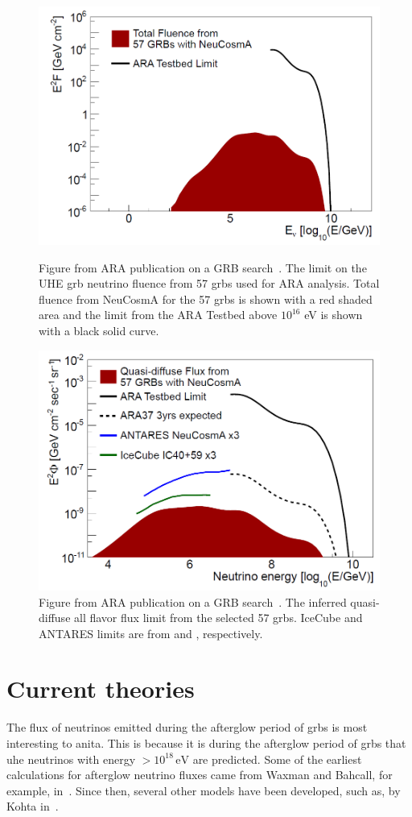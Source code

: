 \begin{figure}
\centering
\includegraphics[width=.8\textwidth]{figures/ara_limit.png}
\caption{Figure from ARA publication on a GRB search~\cite{araproto}.
The limit on the UHE \gls{grb} neutrino fluence from 57 \gls{grbs} used for ARA analysis. Total fluence from NeuCosmA for the 57 \gls{grbs} is shown with a red shaded area and the limit from the ARA Testbed above $10^{16}$ eV is shown with a black solid curve.}
\label{arafluence}
\centering
\includegraphics[width=.8\textwidth]{figures/ara_quasi_diffuse_limits.png}
\caption{Figure from ARA publication on a GRB search~\cite{araproto}. 
The inferred quasi-diffuse all flavor flux limit from the selected 57 \gls{grbs}. IceCube and ANTARES limits are from \cite{IC2012} and \cite{antaresmuon}, respectively.}
\label{araquasiflux}
\end{figure}

\section{Current theories}

The flux of neutrinos emitted during the afterglow period of \gls{grbs} is most interesting to \gls{anita}. This is because it is during the afterglow period of \gls{grbs} that \gls{uhe} neutrinos with energy $>10^{18}\,\mbox{eV}$ are predicted. 
Some of the earliest calculations for afterglow neutrino fluxes came from Waxman and Bahcall, for example, in~\cite{afterglows}.  
Since then, several other models have been developed, such as, by Kohta in~\cite{kohta}. 

